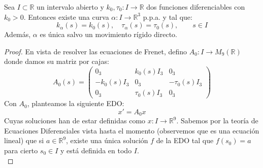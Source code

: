\begin{teo}
    Sea $I\subset \mathbb{R}$ un intervalo abierto y $k_0,\tau_0:I\to \mathbb{R}$ dos funciones diferenciables con $k_0>0$. Entonces existe una curva $\alpha:I\to \mathbb{R}^3$ p.p.a. y tal que:
    \begin{equation*}
        k_\alpha(s) = k_0(s),\quad \tau_\alpha(s) = \tau_0(s), \qquad s\in I
    \end{equation*}
    Además, $\alpha$ es única salvo un movimiento rígido directo.
    \begin{proof}
        En vista de resolver las ecuaciones de Frenet, defino $A_0:I\to M_9(\mathbb{R})$ donde damos su matriz por cajas:
        \begin{equation*}
            A_0(s) = \left(\begin{array}{c|c|c}
                0_3 & k_0(s) I_3 & 0_3 \\
                \hline
                -k_0(s)I_3 & 0_3 & -\tau_0(s)I_3 \\
                \hline
                 0_3 & \tau_0(s)I_3 & 0_3
            \end{array}\right)
        \end{equation*}
        Con $A_0$, planteamos la siguiente EDO:
        \begin{equation*}
            x' = A_0 x 
        \end{equation*}
        Cuyas soluciones han de estar definidas como $x:I\to \mathbb{R}^9$. Sabemos por la teoría de Ecuaciones Diferenciales vista hasta el momento (observemos que es una ecuación lineal) que si $a\in \mathbb{R}^9$, existe una única solución $f$ de la EDO tal que $f(s_0) = a$ para cierto $s_0\in I$ y está definida en todo $I$.\\


\end{proof}
\end{teo}
